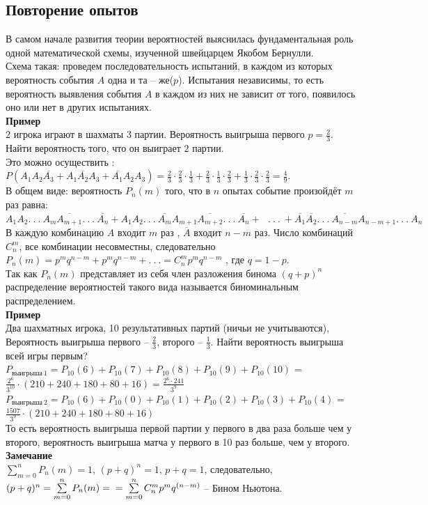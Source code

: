\documentclass[russian, 12pt, fleqn,x11names]{article}
\begin{document}
\subsection{Повторение опытов}
\noindent
В самом начале развития теории вероятностей выяснилась фундаментальная роль одной математической схемы, изученной швейцарцем Якобом Бернулли.\\
Схема такая: проведем последовательность испытаний, в каждом из которых вероятность события $A$ одна и та -- же($p$). Испытания независимы, то есть вероятность выявления события $A$ в каждом из них не зависит от того, появилось оно или нет в других испытаниях.\\
\textbf{Пример\ }\\ $2$ игрока играют в шахматы $3$ партии. Вероятность выигрыша первого $p = \frac{2}{3}$. Найти вероятность того, что он выиграет $2$ партии.\\
Это можно осуществить : \\
$P(A_1A_2\overline{A_3} + A_1\overline{A_2}A_3 + \overline{A_1}A_2A_3)=\frac{2}{3}\cdot\frac{2}{3}\cdot\frac{1}{3} + \frac{2}{3}\cdot\frac{1}{3}\cdot\frac{2}{3} + \frac{1}{3}\cdot\frac{2}{3}\cdot\frac{2}{3} = \frac{4}{9}.$\\
В общем виде: вероятность $P_n(m)$  того, что в $n$ опытах событие произойдёт $m$ раз равна: $A_1A_2.\ . \ . \ A_m\overline{A_{m+1}}.\ .\ .\ \overline{A_n} + 
A_1A_2.\ . \ . \ \overline{A_m} A_{m+1} \overline{A_{m+2}} .\ .\ .\ \overline{A_n} +
\ \ \ .\ .\ .\ 
+\overline{A_1}\overline{A_2}.\ . \ . \ \overline{A_{n-m}} {A_{n-m+1}} .\ .\ .\ A_n$
В каждую комбинацию $A$ входит $m$ раз ,  $\overline{A}$ входит $n - m$ раз.
Число комбинаций $C^m_n$, все комбинации несовместны, следовательно $P_n(m) = p^mq^{n-m} + p^mq^{n-m} + .\ .\ . = C^m_np^mq^{n-m}$ , где $q = 1 - p$.\\
Так как ${P_n(m)}$ представляет из себя член разложения бинома {$(q+p)^n$}\\
 распределение вероятностей такого вида называется биноминальным распределением.\\
\textbf{Пример\ }\\
Два шахматных игрока, 10 результативных партий (ничьи не учитываются), Вероятность выигрыша первого -- $\frac{2}{3}$, второго -- $\frac{1}{3}$. Найти вероятность выигрыша
 всей игры первым?\\
$P_{выигрыша\ 1} = P_{10}(6) + P_{10}(7) + P_{10}(8) + P_{10}(9) +  P_{10}(10)$ = $\frac{2^6}{3^{10}}\cdot(210+240+180+80+16) = \frac{2^6\cdot241}{3^{9}}$
$P_{выигрыша\ 2} = P_{10}(6) + P_{10}(0) + P_{10}(1) + P_{10}(2) +  P_{10}(3)  +  P_{10}(4)$ = $\frac{1507}{3^{9}}\cdot(210+240+180+80+16)$\\
То есть вероятность выигрыша первой партии у первого в два раза больше чем у второго, вероятность выигрыша матча у первого в 10 раз больше, чем у второго.\\
\textbf{Замечание\ } \\
$\sum\limits_{m = 0}^{n}P_n(m) = 1$, $(p+q)^n=1$, $p+q = 1$, следовательно, $(p+q)^n = \sum\limits_{m = 0}^{n}P_n(m)  =\\= \sum\limits_{m = 0}^{n}C^m_np^mq^{(n-m)}$ -- Бином Ньютона.\\
\end{document}
